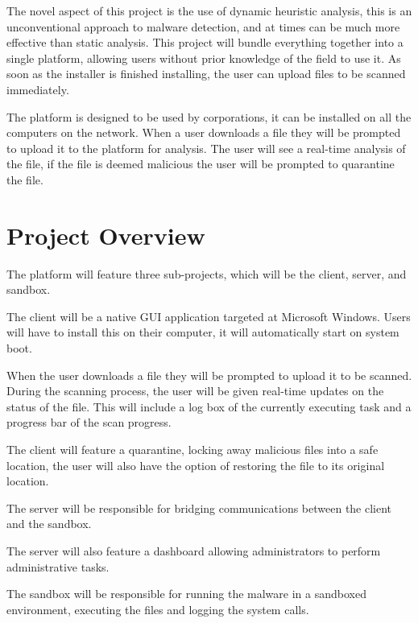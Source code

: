 The novel aspect of this project is the use of dynamic heuristic analysis,
this is an unconventional approach to malware detection,
and at times can be much more effective than static analysis.
This project will bundle everything together into a single platform,
allowing users without prior knowledge of the field to use it.
As soon as the installer is finished installing,
the user can upload files to be scanned immediately.

The platform is designed to be used by corporations,
it can be installed on all the computers on the network.
When a user downloads a file they will be prompted to upload it to the platform for analysis.
The user will see a real-time analysis of the file,
if the file is deemed malicious the user will be prompted to quarantine the file.




\section{Project Overview}
The platform will feature three sub-projects, which will be the client, server, and sandbox.

The client will be a native GUI application targeted at Microsoft Windows.
Users will have to install this on their computer,
it will automatically start on system boot.

When the user downloads a file they will be prompted to upload it to be scanned.
During the scanning process, the user will be given real-time updates on the status of the file.
This will include a log box of the currently executing task and a progress bar of the scan progress.

The client will feature a quarantine, locking away malicious files into a safe location,
the user will also have the option of restoring the file to its original location.

The server will be responsible for bridging communications between the client and the sandbox.

The server will also feature a dashboard allowing administrators to perform administrative tasks.

The sandbox will be responsible for running the malware in a sandboxed environment,
executing the files and logging the system calls.


